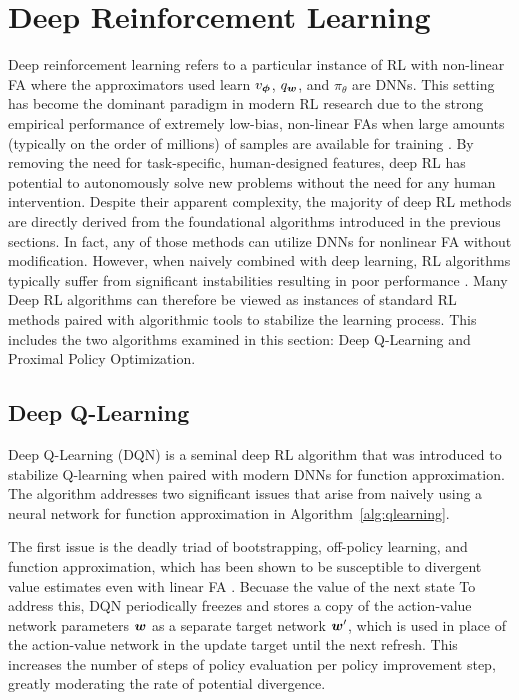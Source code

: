   \section{Deep Reinforcement Learning}
  Deep reinforcement learning refers to a particular instance of RL with non-linear FA where the approximators used learn $v_{\bm \phi}$, $q_{\bm w}$, and $\pi_\theta$ are DNNs. This setting has become the dominant paradigm in modern RL research due to the strong empirical performance of extremely low-bias, non-linear FAs when large amounts (typically on the order of millions) of samples are available for training . By removing the need for task-specific, human-designed features, deep RL has potential to autonomously solve new problems without the need for any human intervention. Despite their apparent complexity, the majority of deep RL methods are directly derived from the foundational algorithms introduced in the previous sections. In fact, any of those methods can utilize DNNs for nonlinear FA without modification. However, when naively combined with deep learning, RL algorithms typically suffer from significant instabilities resulting in poor performance . Many Deep RL algorithms can therefore be viewed as instances of standard RL methods paired with algorithmic tools to stabilize the learning process. This includes the two algorithms examined in this section: Deep Q-Learning and Proximal Policy Optimization.
  
  \subsection{Deep Q-Learning} 
  Deep Q-Learning (DQN)  is a seminal deep RL algorithm that was introduced to stabilize Q-learning when paired with modern DNNs for function approximation. The algorithm addresses two significant issues that arise from naively using a neural network for function approximation in Algorithm~\ref{alg:qlearning}. 
  
  The first issue is the deadly triad \cite{sutton1998introduction} of bootstrapping, off-policy learning, and function approximation, which has been shown to be susceptible to divergent value estimates even with linear FA . Becuase the value of the next state 
  To address this, DQN periodically freezes and stores a copy of the action-value network parameters ${\bm w}$ as a separate target network ${\bm w}'$, which is used in place of the action-value network in the update target until the next refresh. This increases the number of steps of policy evaluation per policy improvement step, greatly moderating the rate of potential divergence. 
  
